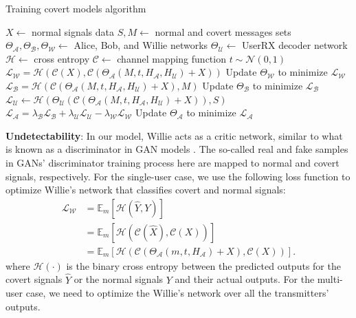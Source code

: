 \begin{algorithm}[tp!]
	\caption{Training covert models algorithm}\label{alg:train}
	\small
	\begin{algorithmic}
		\State $X \gets$ normal signals data
		\State $S, M \gets$ normal and covert messages sets
		\State $\Theta_{\mathcal{A}}, \Theta_{\mathcal{B}}, \Theta_{\mathcal{W}} \gets$ Alice, Bob, and Willie networks
		\State $\Theta_{\mathcal{U}} \gets$ UserRX decoder network
		\State $\mathcal{H} \gets$ cross entropy 
		\State $\mathcal{C} \gets$ channel mapping function
		\State $t \sim \mathcal{N}(0, 1)$
		\State $\mathcal{L}_{\mathcal{W}} = \mathcal{H}(\mathcal{C}(X), \mathcal{C}(\Theta_{\mathcal{A}}(M, t, H_{\mathcal{A}}, H_{\mathcal{U}}) + X))$
		\State Update $\Theta_{\mathcal{W}}$ to minimize $\mathcal{L}_{\mathcal{W}}$
		\State $\mathcal{L}_{\mathcal{B}} = \mathcal{H}(\mathcal{C}(\Theta_{\mathcal{A}}(M, t, H_{\mathcal{A}}, H_{\mathcal{U}}) + X), M)$
		\State Update $\Theta_{\mathcal{B}}$ to minimize $\mathcal{L}_{\mathcal{B}}$
		\State $\mathcal{L}_{\mathcal{U}} \gets \mathcal{H}(\Theta_{\mathcal{U}}(\mathcal{C}(\Theta_{\mathcal{A}}(M, t, H_{\mathcal{A}}, H_{\mathcal{U}}) + X)), S)$
		\State
		$\mathcal{L}_{\mathcal{A}} = \lambda_{\mathcal{B}} \mathcal{L}_{\mathcal{B}} + \lambda_{\mathcal{U}} \mathcal{L}_{\mathcal{U}} - \lambda_{\mathcal{W}} \mathcal{L}_{\mathcal{W}}$
		\State Update $\Theta_{\mathcal{A}}$ to minimize $\mathcal{L}_{\mathcal{A}}$
		\EndFor
	\end{algorithmic}
\end{algorithm}

\textbf{Undetectability}: In our model, Willie acts as a critic network, similar to what is known as a discriminator in GAN models \cite{goodfellow2014generative}. The so-called real and fake samples in GANs' discriminator training process here are mapped to normal and covert signals, respectively. For the single-user case, we use the following loss function to optimize Willie's network that classifies covert and normal signals:
\begin{equation}
	\begin{aligned} \label{willie_loss}
	\mathcal{L}_{\mathcal{W}} & = \mathbb{E}_{m}[\mathcal{H}(\hat{Y}, Y)] \\
	& = \mathbb{E}_{m}[\mathcal{H}(\mathcal{C}(\hat{X}), \mathcal{C}(X))] \\
	& = \mathbb{E}_{m}[\mathcal{H}(\mathcal{C}(\Theta_{\mathcal{A}}(m, t, H_{\mathcal{A}}) + X), \mathcal{C}(X))].
	\end{aligned}
\end{equation}
where \(\mathcal{H}(\cdot)\) is the binary cross entropy between the predicted outputs for the covert signals \(\hat{Y}\) or the normal signals \(Y\) and their actual outputs. For the multi-user case, we need to optimize the Willie's network over all the transmitters' outputs.

